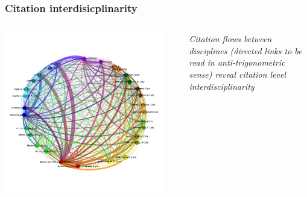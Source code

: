 \begin{frame}
\frametitle{Citation interdisicplinarity}

\begin{columns}
\begin{column}{0.6\textwidth}
\includegraphics[height=0.9\textheight]{figures/citation}
\end{column}
\begin{column}{0.05\textwidth}
\end{column}
\begin{column}{0.25\textwidth}
\justify
\textit{Citation flows between disciplines (directed links to be read in anti-trigonometric sense) reveal citation level interdisciplinarity}
\end{column}
\end{columns}
\end{frame}




